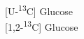 \documentclass{minimal}
\begin{document}
 [U-\textsuperscript{13}C] Glucose
\\[.5cm]
  [1,2-\textsuperscript{13}C] Glucose
\end{document}
